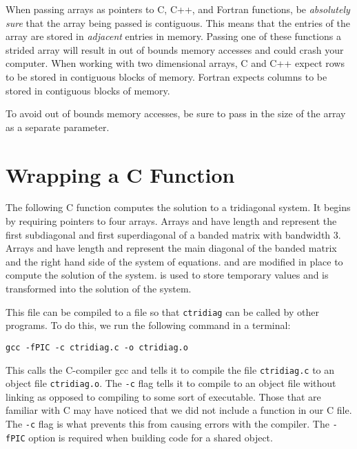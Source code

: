 \begin{warn}
When passing arrays as pointers to C, C++, and Fortran functions, be \emph{absolutely sure} that the array being passed is contiguous.
This means that the entries of the array are stored in \emph{adjacent} entries in memory.
Passing one of these functions a strided array will result in out of bounds memory accesses and could crash your computer.
When working with two dimensional arrays, C and C++ expect rows to be stored in contiguous blocks of memory.
Fortran expects columns to be stored in contiguous blocks of memory.

To avoid out of bounds memory accesses, be sure to pass in the size of the array as a separate parameter.
\end{warn}

\section*{Wrapping a C Function}
The following C function computes the solution to a tridiagonal system.
It begins by requiring pointers to four arrays.
Arrays  and  have length  and represent the first subdiagonal and first superdiagonal of a banded matrix with bandwidth 3.
Arrays  and  have length  and represent the main diagonal of the banded matrix and the right hand side of the system of equations.
 and  are modified in place to compute the solution of the system.
 is used to store temporary values and  is transformed into the solution of the system.



This file can be compiled to a  file so that \texttt{ctridiag} can be called by other programs. To do this, we run the following command in a terminal:
\begin{lstlisting}[style=ShellInput]
gcc -fPIC -c ctridiag.c -o ctridiag.o
\end{lstlisting}
This calls the C-compiler gcc and tells it to compile the file \texttt{ctridiag.c} to an object file \texttt{ctridiag.o}.
The \texttt{-c} flag tells it to compile to an object file without linking as opposed to compiling to some sort of executable.
Those that are familiar with C may have noticed that we did not include a  function in our C file.
The \texttt{-c} flag is what prevents this from causing errors with the compiler.
The \texttt{-fPIC} option is required when building code for a shared object.

